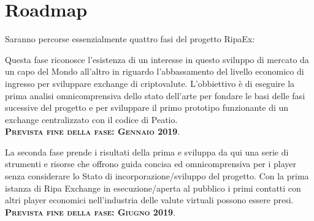\documentclass[11pt,fleqn]{book} %
\begin{document}
\section{Roadmap}
Saranno percorse essenzialmente quattro fasi del progetto RipaEx:
\begin{center}
\begin{tcolorbox}[roadmapBox,
	title=\textbf{\textsc{Finanziamneto del progetto: XPX presale e RIPA TEC (WP2)}}]

	Questa fase riconosce l'esistenza di un interesse in questo sviluppo di mercato
	da un capo del Mondo all'altro in riguardo l'abbassamento del livello economico di ingresso
	per sviluppare exchange di criptovalute.
	L'obbiettivo è di eseguire la prima analisi omnicomprensiva dello stato dell'arte per fondare
	le basi delle fasi sucessive del progetto e per sviluppare il primo prototipo
	funzionante di un exchange centralizzato con il codice di Peatio.\\
	\vspace{1cm}
	\centering\textbf{\textsc{Prevista fine della fase: Gennaio 2019}}.
\end{tcolorbox}
\resizebox{0.05\textwidth}{26pt}{$\Downarrow$}
\begin{tcolorbox}[roadmapBox,
	title=\textbf{\textsc{Apertura del primo exchange e sviluppo di strumenti e risorse (WP3)}}]

	La seconda fase prende i risultati della prima e sviluppa da qui
	una serie di strumenti e risorse che offrono guida concisa ed omnicomprensiva per 
	i player senza considerare lo Stato di incorporazione/sviluppo del progetto. Con la prima
	istanza di Ripa Exchange in esecuzione/aperta al pubblico i primi contatti con altri player economici
	nell'industria delle valute virtuali possono essere presi.\\
	\vspace{1cm}
	\centering\textbf{\textsc{Prevista fine della fase: Giugno 2019}}.
\end{tcolorbox}
\resizebox{0.05\textwidth}{26pt}{$\Downarrow$}
\begin{tcolorbox}[roadmapBox,
	title=\textbf{\textsc{Esecuzione, diffusione (WP 7/8) e Coordinamento del Progetto (WP1)}}]


\end{tcolorbox}
\end{center}
\end{document}
